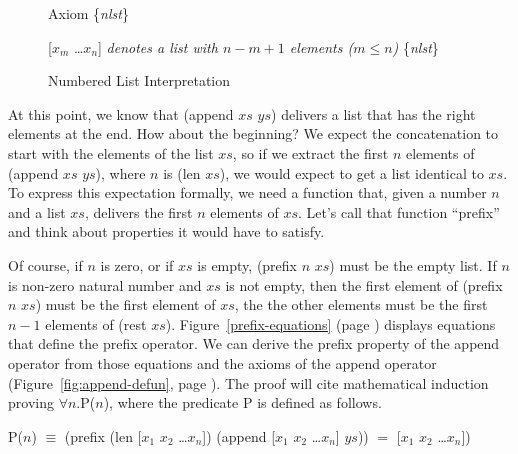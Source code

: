 \begin{figure}
\begin{center}
Axiom \{\emph{nlst}\}

[$x_{m}$ \dots $x_{n}$]  \emph{denotes a list with $n - m + 1$ elements ($m \leq n$)} \{\emph{nlst}\}
\end{center}
\caption{Numbered List Interpretation}
\label{numbered-list-interpretation}
\end{figure}


At this point, we know that (append $xs$ $ys$) delivers
a list that has the right elements at the end.
How about the beginning?
We expect the concatenation to start with the elements of the list $xs$,
so if we extract the first $n$ elements of (append $xs$ $ys$), where $n$ is (len $xs$),
we would expect to get a list identical to $xs$.
To express this expectation formally, we need a function that,
given a number $n$ and a list $xs$, delivers the first $n$ elements of $xs$.
Let's call that function ``prefix'' and think about properties it would have to satisfy.

Of course, if $n$ is zero, or if $xs$ is empty,
(prefix $n$ $xs$) must be the empty list.
If $n$ is non-zero natural number and $xs$ is not empty,
then the first element of (prefix $n$ $xs$) must be the first element of $xs$,
the the other elements must be the first $n-1$ elements of (rest $xs$).
Figure~\ref{prefix-equations} (page \pageref{prefix-equations}) displays
equations that define the prefix operator.
We can derive the prefix property of the append operator
from those equations and the axioms of the append operator
(Figure~\ref{fig:append-defun}, page \pageref{fig:append-defun}).
The proof will cite mathematical induction proving $\forall n.$P($n$),
where the predicate P is defined as follows.

\begin{samepage}
\begin{center}
P($n$) $\equiv$ (prefix (len [$x_1$ $x_2$ \dots $x_n$]) (append [$x_1$ $x_2$ \dots $x_n$] $ys$))
                $=$ [$x_1$ $x_2$ \dots $x_n$])
\end{center}
\end{samepage}

\begin{quote}
\begin{tabbing}

\end{tabbing}
\end{quote}

